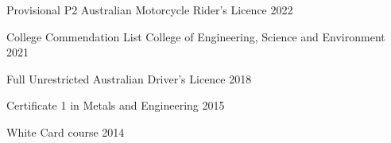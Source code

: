 
\begin{cvhonors}

  \cvhonor
  {Provisional P2 Australian Motorcycle Rider's Licence} %
  {} %
  {} %
  {2022} %

  \cvhonor
  {College Commendation List} %
  {College of Engineering, Science and Environment} %
  {} %
  {2021} %

  \cvhonor
  {Full Unrestricted Australian Driver’s Licence} %
  {} %
  {} %
  {2018} %


  \cvhonor
  {Certificate 1 in Metals and Engineering} %
  {} %
  {} %
  {2015} %


  \cvhonor
  {White Card course} %
  {} %
  {} %
  {2014} %

\end{cvhonors}
